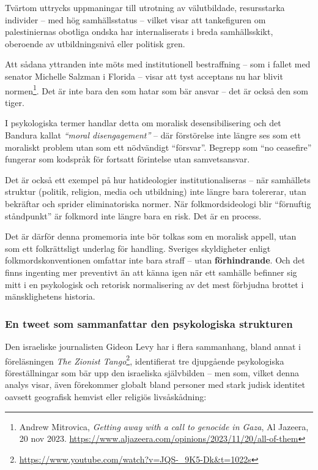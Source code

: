 \documentclass[12pt]{article}
\begin{document}
Tvärtom uttrycks uppmaningar till utrotning av välutbildade, resursstarka individer – med hög samhällsstatus – vilket visar att tankefiguren om palestiniernas obotliga ondska har internaliserats i breda samhällsskikt, oberoende av utbildningsnivå eller politisk gren.

Att sådana yttranden inte möts med institutionell bestraffning – som i fallet med senator Michelle Salzman i Florida – visar att tyst acceptans nu har blivit normen\footnote{Andrew Mitrovica, \textit{Getting away with a call to genocide in Gaza}, Al Jazeera, 20 nov 2023. \url{https://www.aljazeera.com/opinions/2023/11/20/all-of-them}}. Det är inte bara den som hatar som bär ansvar – det är också den som tiger.

I psykologiska termer handlar detta om moralisk desensibilisering och det Bandura kallat \textit{“moral disengagement”} – där förstörelse inte längre ses som ett moraliskt problem utan som ett nödvändigt “försvar”. Begrepp som “no ceasefire” fungerar som kodspråk för fortsatt förintelse utan samvetsansvar.

Det är också ett exempel på hur hatideologier institutionaliseras – när samhällets struktur (politik, religion, media och utbildning) inte längre bara tolererar, utan bekräftar och sprider eliminatoriska normer. När folkmordsideologi blir “förnuftig ståndpunkt” är folkmord inte längre bara en risk. Det är en process.

Det är därför denna promemoria inte bör tolkas som en moralisk appell, utan som ett folkrättsligt underlag för handling. Sveriges skyldigheter enligt folkmordskonventionen omfattar inte bara straff – utan \textbf{förhindrande}. Och det finns ingenting mer preventivt än att känna igen när ett samhälle befinner sig mitt i en psykologisk och retorisk normalisering av det mest förbjudna brottet i mänsklighetens historia.


\subsubsection*{En tweet som sammanfattar den psykologiska strukturen}

Den israeliske journalisten Gideon Levy har i flera sammanhang, bland annat i föreläsningen \textit{The Zionist Tango}\footnote{\url{https://www.youtube.com/watch?v=JQS-_9K5-Dk&t=1022s}}, identifierat tre djupgående psykologiska föreställningar som bär upp den israeliska självbilden – men som, vilket denna analys visar, även förekommer globalt bland personer med stark judisk identitet oavsett geografisk hemvist eller religiös livsåskådning:
\end{document}
